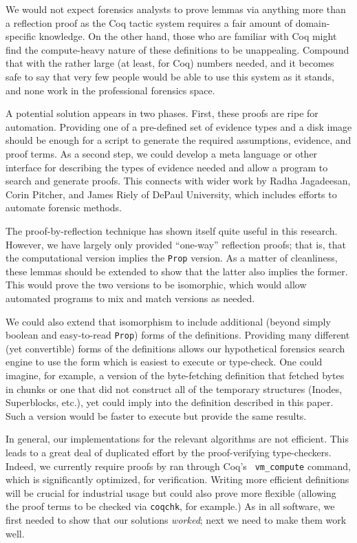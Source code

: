 \documentclass[nocopyrightspace,preprint]{sigplanconf}
\begin{document}
We would not expect forensics analysts to prove lemmas via anything more than
a reflection proof as the Coq tactic system requires a fair amount of
domain-specific knowledge. On the other hand, those who are familiar with Coq
might find the compute-heavy nature of these definitions to be unappealing.
Compound that with the rather large (at least, for Coq) numbers needed, and it
becomes safe to say that very few people would be able to use this system as
it stands, and none work in the professional forensics space.

A potential solution appears in two phases. First, these proofs are ripe for
automation. Providing one of a pre-defined set of evidence types and a disk
image should be enough for a script to generate the required assumptions,
evidence, and proof terms. As a second step, we could develop a meta language
or other interface for describing the types of evidence needed and allow a
program to search and generate proofs. This connects with wider work by Radha
Jagadeesan, Corin Pitcher, and James Riely of DePaul University, which
includes efforts to automate forensic methods.

The proof-by-reflection technique has shown itself quite useful in this
research. However, we have largely only provided ``one-way'' reflection
proofs; that is, that the computational version implies the {\tt Prop}
version. As a matter of cleanliness, these lemmas should be extended to show
that the latter also implies the former. This would prove the two versions to
be isomorphic, which would allow automated programs to mix and match versions
as needed. 

We could also extend that isomorphism to include additional (beyond simply
boolean and easy-to-read {\tt Prop}) forms of the definitions. Providing many
different (yet convertible) forms of the definitions allows our hypothetical
forensics search engine to use the form which is easiest to execute or
type-check. One could imagine, for example, a version of the byte-fetching
definition that fetched bytes in chunks or one that did not construct all of
the temporary structures (Inodes, Superblocks, etc.), yet could imply into
the definition described in this paper. Such a version would be faster to
execute but provide the same results.

In general, our implementations for the relevant algorithms are not efficient.
This leads to a great deal of duplicated effort by the proof-verifying
type-checkers. Indeed, we currently require proofs by ran through Coq's {\tt
vm\_compute} command, which is significantly optimized, for verification.
Writing more efficient definitions will be crucial for industrial usage but
could also prove more flexible (allowing the proof terms to be checked via
{\tt coqchk}, for example.) As in all software, we first needed to show that
our solutions {\em worked}; next we need to make them work well.
\end{document}
